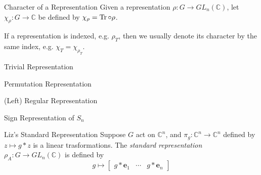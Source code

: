 
\begin{defn}{Character of a Representation}{}
	Given a representation \(\rho\colon G \to GL_n(\mathbb{C})\), let \(\chi_\rho\colon G \to \mathbb{C}\) be defined by \(\chi_\rho = \operatorname{Tr} \circ \rho\).
\end{defn}

If a representation is indexed, e.g. \(\rho_T\), then we usually denote its character by the same index, e.g. \(\chi_T = \chi_{\rho_T}\).

\begin{exmp}{Trivial Representation}{}
  
\end{exmp}

\begin{exmp}{Permutation Representation}{}
  
\end{exmp}

\begin{exmp}{(Left) Regular Representation}{}
  
\end{exmp}

\begin{exmp}{Sign Representation of \(S_n\)}{}
  
\end{exmp}

\begin{exmp}{Liz's Standard Representation}{}
  Suppose \(G\) act on \(\mathbb{C}^n\), and \(\pi_g \colon \mathbb{C}^n \to \mathbb{C}^n\) defined by \(z \mapsto g * z\) is a linear trasformations. The \emph{standard representation} \(\rho_A \colon G \to GL_n(\mathbb{C})\) is defined by \[
    g \mapsto 
	\begin{bmatrix}
	  g * \mathbf{e}_1 &
	  \cdots &
	  g * \mathbf{e}_n
	\end{bmatrix}
  \] 
\end{exmp}
